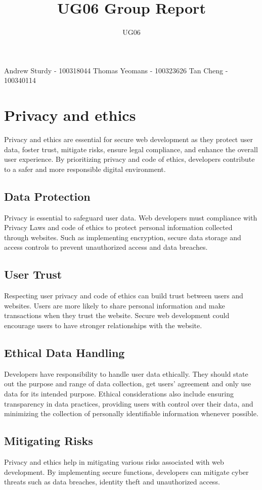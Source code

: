 \documentclass{cmpstyle}
\title{UG06 Group Report}
\author{UG06}
\begin{document}
Andrew Sturdy - 100318044\newline
Thomas Yeomans - 100323626\newline
Tan Cheng - 100340114
\section{Privacy and ethics}
Privacy and ethics are essential for secure web development as they protect user data, foster trust, mitigate risks, ensure legal compliance, and enhance the overall user experience. By prioritizing privacy and code of ethics, developers contribute to a safer and more responsible digital environment.
\subsection{Data Protection}
Privacy is essential to safeguard user data. Web developers must compliance with Privacy Laws and code of ethics to protect personal information collected through websites. Such as implementing encryption, secure data storage and access controls to prevent unauthorized access and data breaches.
\subsection{User Trust}
Respecting user privacy and code of ethics can build trust between users and websites. Users are more likely to share personal information and make transactions when they trust the website. Secure web development could encourage users to have stronger relationships with the website.
\subsection{Ethical Data Handling}
Developers have responsibility to handle user data ethically. They should state out the purpose and range of data collection, get users' agreement and only use data for its intended purpose. Ethical considerations also include ensuring transparency in data practices, providing users with control over their data, and minimizing the collection of personally identifiable information whenever possible.
\subsection{Mitigating Risks}
Privacy and ethics help in mitigating various risks associated with web development. By implementing secure functions, developers can mitigate cyber threats such as data breaches, identity theft and unauthorized access. 
\end{document}

